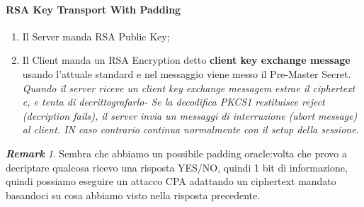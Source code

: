\documentclass{book}
\theoremstyle{remark}
\newtheorem*{remark}{\textbf{Remark}}
\begin{document}
\paragraph{RSA Key Transport With Padding}
\begin{enumerate}
	\item Il Server manda RSA Public Key;\@
	\item Il Client manda un RSA Encryption detto \textbf{client key exchange message} usando l'attuale standard e nel messaggio viene messo il Pre-Master Secret\@. \newline \emph{Quando il server riceve un client key exchange messagem estrae il ciphertext c, e tenta di decrittografarlo- Se la decodifica PKCS1 restituisce reject (decription fails), il server invia un messaggi di interruzione (abort message) al client\@. IN caso contrario continua normalmente con il setup della sessione\@.}
\end{enumerate}
\begin{remark}
	Sembra che abbiamo un possibile padding oracle:\@ogni volta che provo a decriptare qualcosa ricevo una risposta YES/NO, quindi 1 bit di informazione, quindi possiamo eseguire un attacco CPA adattando un ciphertext mandato basandoci su cosa abbiamo visto nella risposta precedente\@.
\end{remark}
\end{document}
